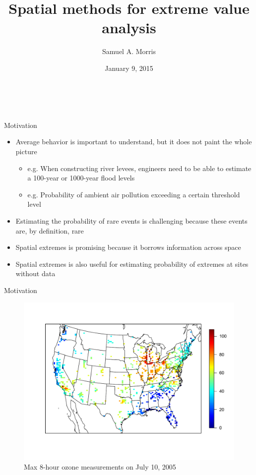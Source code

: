 \documentclass{beamer}
\title[Spatial methods for EVA] %
{
  Spatial methods for extreme value analysis
}
\author[S. Morris]{Samuel A. Morris}
\institute[]{North Carolina State University}
\date[]{January 9, 2015}
\begin{document}
\begin{frame}\frametitle{\ }
\begin{center}
  \maketitle
\end{center}
\end{frame}

\begin{frame}{Motivation}
  \begin{itemize} \setlength{\itemsep}{1em}
    \item Average behavior is important to understand, but it does not paint the whole picture
    \begin{itemize}
      \item e.g. When constructing river levees, engineers need to be able to estimate a 100-year or 1000-year flood levels
      \item e.g. Probability of ambient air pollution exceeding a certain threshold level
    \end{itemize}
    \item Estimating the probability of rare events is challenging because these events are, by definition, rare
    \item Spatial extremes is promising because it borrows information across space
    \item Spatial extremes is also useful for estimating probability of extremes at sites without data
  \end{itemize}
\end{frame}

\begin{frame}{Motivation}
  \centering
  \begin{figure}
    \includegraphics[width=\linewidth, trim=0 1in 0 1in ]{./plots/pot/ozone-10jul-us.pdf}
    \caption{Max 8-hour ozone measurements on July 10, 2005}
   \end{figure}
\end{frame}
\end{document}
